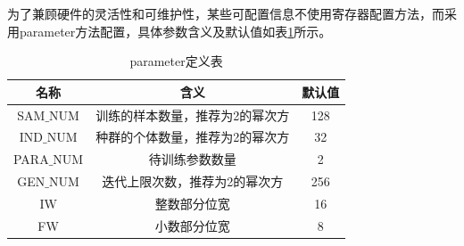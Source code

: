 为了兼顾硬件的灵活性和可维护性，某些可配置信息不使用寄存器配置方法，而采用parameter方法配置，具体参数含义及默认值如表\ref{tab:parameter定义表}所示。
\begin{table}[htb]
    \centering
    \caption{parameter定义表}
    \label{tab:parameter定义表}
        \begin{tabular}{c|c|c}
        \hline
        名称          & 含义                            & 默认值     \\ \hline
        SAM$\_$NUM    & 训练的样本数量，推荐为2的幂次方   & 128           \\ \hline
        IND$\_$NUM    & 种群的个体数量，推荐为2的幂次方   & 32            \\ \hline
        PARA$\_$NUM   & 待训练参数数量                  & 2      \\ \hline
        GEN$\_$NUM    & 迭代上限次数，推荐为2的幂次方    & 256       \\ \hline
        IW            & 整数部分位宽                    & 16      \\ \hline
        FW            & 小数部分位宽                    & 8     \\ \hline
    \end{tabular}
  \end{table}

